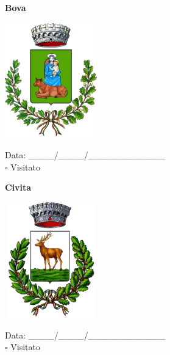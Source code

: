 \documentclass[a5paper,12pt]{article}
\begin{document}
\noindent
\begin{minipage}[t]{0.45\textwidth}
    \begin{center}
        \textbf{Bova}
    \end{center}
    \vspace{-0.5cm} %
    \begin{center}
        \includegraphics[height= 5cm, width=4cm]{Calabria/Bova-Stemma.png}
    \end{center}
    \vspace{-0.4cm} %
    \begin{flushleft}
        Data: \_\_\_\_/\_\_\_\_/\_\_\_\_\_\_\_\_\_\_\_\_ \\
        $\square$ Visitato
    \end{flushleft}
\end{minipage}
\hfill
\noindent
\begin{minipage}[t]{0.45\textwidth}
    \begin{center}
        \textbf{Civita}
    \end{center}
    \vspace{-0.5cm} %
    \begin{center}
        \includegraphics[height= 5cm, width=4cm]{Calabria/Civita-Stemma.png}
    \end{center}
    \vspace{-0.4cm} %
    \begin{flushleft}
        Data: \_\_\_\_/\_\_\_\_/\_\_\_\_\_\_\_\_\_\_\_\_ \\
        $\square$ Visitato
    \end{flushleft}
\end{minipage}
\end{document}
